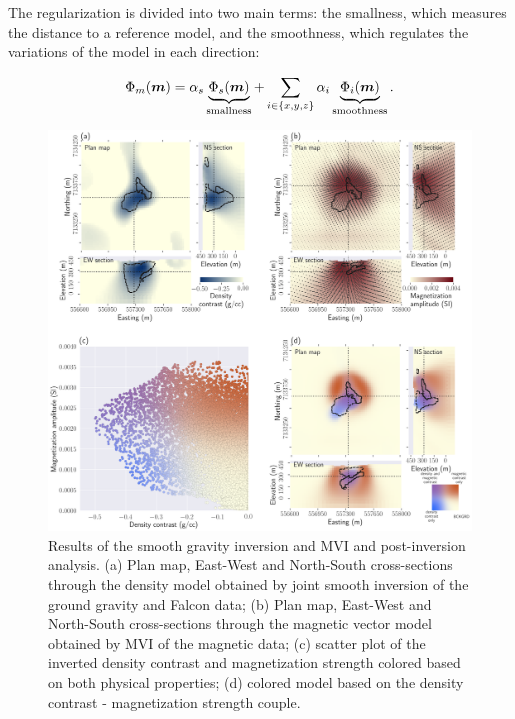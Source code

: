 \documentclass[paper, twocolumn]{geophysics} %
\newcommand{\mathbf}[1]{
  \hbox{\mathversion{bold}$#1$}}
\begin{document}
The regularization is divided into two main terms: the smallness, which measures the distance to a reference model, and the smoothness, which regulates the variations of the model in each direction:

\begin{align}
\Phi_{m}(\mathbf{m})= \alpha_s \underbrace{\Phi_{s}(\mathbf{m})}_{\text{smallness}} + \sum_{i\in{\{x,y,z\}}}\alpha_i\underbrace{\Phi_{i}(\mathbf{m})}_{\text{smoothness}}. \label{regularizer}
\end{align}


\begin{figure}
\centering
\includegraphics[width=\textwidth]{Figures/300dpi/Figure5.png}
\caption{Results of the smooth gravity inversion and MVI and post-inversion analysis. (a) Plan map, East-West and North-South cross-sections through the density model obtained by joint smooth inversion of the ground gravity and Falcon data; (b) Plan map, East-West and North-South cross-sections through the magnetic vector model obtained by MVI of the magnetic data; (c) scatter plot of the inverted density contrast and magnetization strength colored based on both physical properties; (d) colored model based on the density contrast - magnetization strength couple.}
\label{fig:Figure5.png}
\end{figure}
\end{document}
